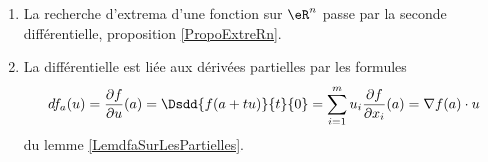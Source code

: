 \begin{enumerate}
    \item
        La recherche d'extrema d'une fonction sur \( \eR^n\) passe par la seconde différentielle, proposition \ref{PropoExtreRn}.
    \item
        La différentielle est liée aux dérivées partielles par les formules
	\begin{equation}
        df_a(u)=\frac{ \partial f }{ \partial u }(a)=\Dsdd{ f(a+tu) }{t}{0}=\sum_{i=1}^mu_i\frac{ \partial f }{ \partial x_i }(a)=\nabla f(a)\cdot u
	\end{equation}
    du lemme \ref{LemdfaSurLesPartielles}.
\end{enumerate}
